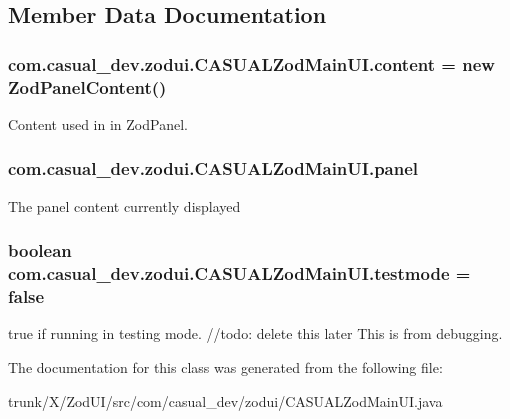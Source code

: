 \subsection{Member Data Documentation}
\hypertarget{classcom_1_1casual__dev_1_1zodui_1_1_c_a_s_u_a_l_zod_main_u_i_a5580e1b051bd203106d03dfe39e5d944}{
\subsubsection[{content}]{ com.\-casual\-\_\-dev.\-zodui.\-C\-A\-S\-U\-A\-L\-Zod\-Main\-U\-I.\-content = new {\bf Zod\-Panel\-Content}()\hspace{0.3cm}{\ttfamily [static]}}}\label{classcom_1_1casual__dev_1_1zodui_1_1_c_a_s_u_a_l_zod_main_u_i_a5580e1b051bd203106d03dfe39e5d944}
Content used in in Zod\-Panel. \hypertarget{classcom_1_1casual__dev_1_1zodui_1_1_c_a_s_u_a_l_zod_main_u_i_ad415d8420f386b81ca76e507033c1dc4}{
\subsubsection[{panel}]{ com.\-casual\-\_\-dev.\-zodui.\-C\-A\-S\-U\-A\-L\-Zod\-Main\-U\-I.\-panel}}\label{classcom_1_1casual__dev_1_1zodui_1_1_c_a_s_u_a_l_zod_main_u_i_ad415d8420f386b81ca76e507033c1dc4}
The panel content currently displayed \hypertarget{classcom_1_1casual__dev_1_1zodui_1_1_c_a_s_u_a_l_zod_main_u_i_aac679df84fcf6f2de09324adc88450c3}{
\subsubsection[{testmode}]{\setlength{\rightskip}{0pt plus 5cm}boolean com.\-casual\-\_\-dev.\-zodui.\-C\-A\-S\-U\-A\-L\-Zod\-Main\-U\-I.\-testmode = false\hspace{0.3cm}{\ttfamily [static]}}}\label{classcom_1_1casual__dev_1_1zodui_1_1_c_a_s_u_a_l_zod_main_u_i_aac679df84fcf6f2de09324adc88450c3}
true if running in testing mode. //todo\-: delete this later This is from debugging. 

The documentation for this class was generated from the following file\-:\begin{DoxyCompactItemize}
\item 
trunk/\-X/\-Zod\-U\-I/src/com/casual\-\_\-dev/zodui/C\-A\-S\-U\-A\-L\-Zod\-Main\-U\-I.\-java\end{DoxyCompactItemize}

